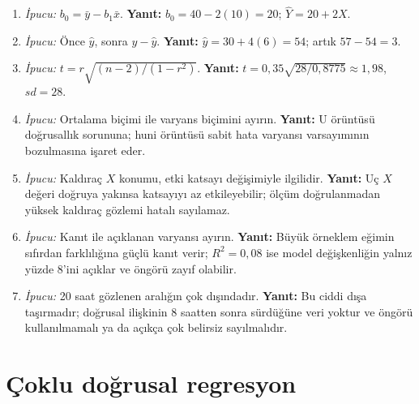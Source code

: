 \begin{enumerate}[leftmargin=*,itemsep=5pt]
\item \emph{İpucu:} $b_0=\bar y-b_1\bar x$.
\textbf{Yanıt:} $b_0=40-2(10)=20$; $\hat Y=20+2X$.
\item \emph{İpucu:} Önce $\hat y$, sonra $y-\hat y$.
\textbf{Yanıt:} $\hat y=30+4(6)=54$; artık $57-54=3$.
\item \emph{İpucu:} $t=r\sqrt{(n-2)/(1-r^2)}$.
\textbf{Yanıt:} $t=0{,}35\sqrt{28/0{,}8775}\approx1{,}98$, $sd=28$.
\item \emph{İpucu:} Ortalama biçimi ile varyans biçimini ayırın.
\textbf{Yanıt:} U örüntüsü doğrusallık sorununa; huni örüntüsü sabit hata
varyansı varsayımının bozulmasına işaret eder.
\item \emph{İpucu:} Kaldıraç $X$ konumu, etki katsayı değişimiyle ilgilidir.
\textbf{Yanıt:} Uç $X$ değeri doğruya yakınsa katsayıyı az etkileyebilir;
ölçüm doğrulanmadan yüksek kaldıraç gözlemi hatalı sayılamaz.
\item \emph{İpucu:} Kanıt ile açıklanan varyansı ayırın.
\textbf{Yanıt:} Büyük örneklem eğimin sıfırdan farklılığına güçlü kanıt verir;
$R^2=0{,}08$ ise model değişkenliğin yalnız yüzde 8'ini açıklar ve öngörü zayıf olabilir.
\item \emph{İpucu:} 20 saat gözlenen aralığın çok dışındadır.
\textbf{Yanıt:} Bu ciddi dışa taşırmadır; doğrusal ilişkinin 8 saatten sonra
sürdüğüne veri yoktur ve öngörü kullanılmamalı ya da açıkça çok belirsiz sayılmalıdır.
\end{enumerate}

\ifimoders\else
\section{Çoklu doğrusal regresyon}

